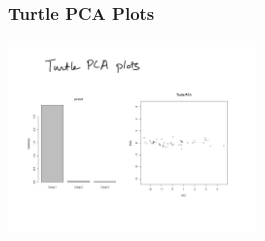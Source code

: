 \documentclass{beamer}
\begin{document}
\begin{frame}
  \frametitle{Turtle PCA Plots}

\begin{center}
\includegraphics[height=2in]{turtle-pca}
\end{center}
\end{frame}



  





\end{document}

